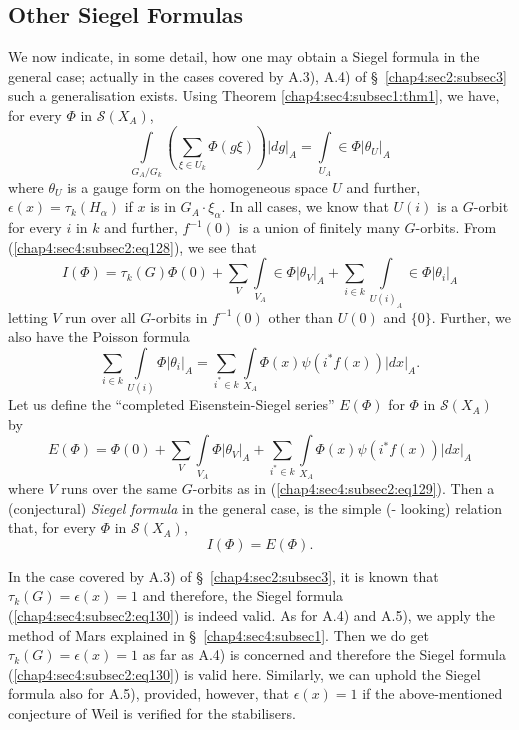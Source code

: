 \subsection{Other Siegel Formulas}\label{chap4:sec4:subsec2} %

We now indicate, in some detail, how one may obtain a Siegel formula
in the general case; actually in the cases covered by A.3), A.4) of
\S\ \ref{chap4:sec2:subsec3} such a generalisation exists. Using Theorem
\ref{chap4:sec4:subsec1:thm1}, we have, for every $\Phi$ in $\mathscr{S}(X_{A})$,
\begin{equation*}
  \int\limits_{G_{A}/G_{k}}\left(\sum_{\xi\in
    U_{k}}\Phi(g\xi)\right)|dg|_{A}=\int\limits_{U_{A}}\in
  \Phi|\theta_{U}|_{A}\tag{128} \label{chap4:sec4:subsec2:eq128}
\end{equation*}
where $\theta_{U}$ is a gauge form on the homogeneous space $U$ and
further, $\epsilon(x)=\tau_{k}(H_{\alpha})$ if $x$ is in $G_{A}\cdot
\xi_{\alpha}$. In all cases, we know that $U(i)$ is a $G$-orbit for
every $i$ in $k$ and further, $f^{-1}(0)$ is a union of finitely many
$G$-orbits. From (\ref{chap4:sec4:subsec2:eq128}), we see that
\begin{equation*}
  I(\Phi)=\tau_{k}(G)\Phi(0)+\sum_{V}\int\limits_{V_{A}}\in
  \Phi|\theta_{V}|_{A}+\sum_{i\in
    k}\int\limits_{U(i)_{A}}\in\Phi|\theta_{i}|_{A}\tag{129}
  \label{chap4:sec4:subsec2:eq129}
\end{equation*}
letting $V$ run over all $G$-orbits in $f^{-1}(0)$ other than $U(0)$
and $\{0\}$. Further, we also have the Poisson formula 
$$
\sum_{i\in k}\int\limits_{U(i)}\Phi|\theta_{i}|_{A}=\sum_{i^{\ast}\in
  k}\int\limits_{X_{A}}\Phi(x)\psi(i^{\ast}f(x))|dx|_{A}.
$$\pageoriginale
Let us define the ``completed Eisenstein-Siegel series'' $E(\Phi)$ for
$\Phi$ in $\mathscr{S}(X_{A})$ by
$$
E(\Phi)=\Phi(0)+\sum_{V}\int\limits_{V_{A}}\Phi|\theta_{V}|_{A}+\sum_{i^{\ast}\in
  k}\int\limits_{X_{A}}\Phi(x)\psi(i^{\ast}f(x))|dx|_{A}
$$
where $V$ runs over the same $G$-orbits as in
(\ref{chap4:sec4:subsec2:eq129}). Then a 
(conjectural) {\em Siegel formula} in the general case, is the simple
(- looking) relation that, for every $\Phi$ in $\mathscr{S}(X_{A})$,
\begin{equation*}
  I(\Phi)=E(\Phi).\tag{130}\label{chap4:sec4:subsec2:eq130} 
\end{equation*}

In the case covered by A.3) of \S\ \ref{chap4:sec2:subsec3}, it is
known that 
$\tau_{k}(G)=\epsilon(x)=1$ and therefore, the Siegel formula
(\ref{chap4:sec4:subsec2:eq130}) is indeed valid. As for A.4) and
A.5), we apply the method 
of Mars explained in \S\ \ref{chap4:sec4:subsec1}. Then we do get
$\tau_{k}(G)=\epsilon(x)=1$ as far as A.4) is concerned and therefore
the Siegel formula (\ref{chap4:sec4:subsec2:eq130}) is valid here. Similarly, we can uphold
the Siegel formula also for A.5), provided, however, that
$\epsilon(x)=1$ \ie if the above-mentioned conjecture of Weil is
verified for the stabilisers.

